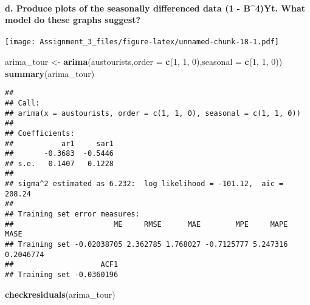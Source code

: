 \documentclass[]{article}
\newenvironment{Shaded}{\begin{snugshade}}{\end{snugshade}}
\newcommand{\KeywordTok}[1]{\textcolor[rgb]{0.13,0.29,0.53}{\textbf{#1}}}
\newcommand{\DataTypeTok}[1]{\textcolor[rgb]{0.13,0.29,0.53}{#1}}
\newcommand{\DecValTok}[1]{\textcolor[rgb]{0.00,0.00,0.81}{#1}}
\newcommand{\StringTok}[1]{\textcolor[rgb]{0.31,0.60,0.02}{#1}}
\newcommand{\OperatorTok}[1]{\textcolor[rgb]{0.81,0.36,0.00}{\textbf{#1}}}
\newcommand{\NormalTok}[1]{#1}
\let\oldparagraph\paragraph
\renewcommand{\paragraph}[1]{\oldparagraph{#1}\mbox{}}
\begin{document}
\paragraph{d. Produce plots of the seasonally differenced data (1 -
B\^{}4)Yt. What model do these graphs
suggest?}\label{d.-produce-plots-of-the-seasonally-differenced-data-1---b4yt.-what-model-do-these-graphs-suggest}

\begin{Shaded}
\end{Shaded}

\texttt{[image: Assignment\_3\_files/figure-latex/unnamed-chunk-18-1.pdf]}

\begin{Shaded}
\begin{Highlighting}[]
\NormalTok{arima_tour <-}\StringTok{ }\KeywordTok{arima}\NormalTok{(austourists,}\DataTypeTok{order =} \KeywordTok{c}\NormalTok{(}\DecValTok{1}\NormalTok{, }\DecValTok{1}\NormalTok{, }\DecValTok{0}\NormalTok{),}\DataTypeTok{seasonal =} \KeywordTok{c}\NormalTok{(}\DecValTok{1}\NormalTok{, }\DecValTok{1}\NormalTok{, }\DecValTok{0}\NormalTok{))}
\KeywordTok{summary}\NormalTok{(arima_tour)}
\end{Highlighting}
\end{Shaded}

\begin{verbatim}
## 
## Call:
## arima(x = austourists, order = c(1, 1, 0), seasonal = c(1, 1, 0))
## 
## Coefficients:
##           ar1     sar1
##       -0.3683  -0.5446
## s.e.   0.1407   0.1228
## 
## sigma^2 estimated as 6.232:  log likelihood = -101.12,  aic = 208.24
## 
## Training set error measures:
##                       ME     RMSE      MAE        MPE     MAPE      MASE
## Training set -0.02038705 2.362785 1.768027 -0.7125777 5.247316 0.2046774
##                    ACF1
## Training set -0.0360196
\end{verbatim}

\begin{Shaded}
\begin{Highlighting}[]
\KeywordTok{checkresiduals}\NormalTok{(arima_tour)}
\end{Highlighting}
\end{Shaded}
\end{document}
